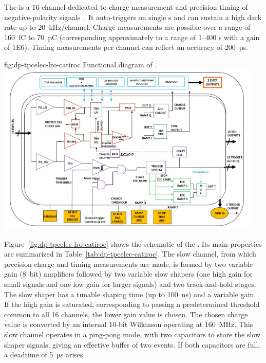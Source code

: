 The  is a \num{16} channel  dedicated to %
charge measurement and precision timing of negative-polarity  signals~\cite{Blin:2017}. It auto-triggers on single \phel{}s and can sustain a high dark rate up to \SI{20}{kHz/channel}. Charge measurements are possible over a range of \SI{160}{fC} to \SI{70}{pC} (corresponding approximately to a range of \numrange{1}{400} \phel{}s with a  gain of \num{1E6}). Timing measurements per channel can reflect an accuracy of \SI{200}{ps}.

\begin{dunefigure}{fig:dp-tpcelec-lro-catiroc}
{Functional diagram of  .}
\includegraphics[width=0.95\textwidth]{graphics/dp-tpcelec-lro-catiroc}
\end{dunefigure}


Figure~\ref{fig:dp-tpcelec-lro-catiroc} shows the schematic of the  . Its main properties are summarized in Table~\ref{tab:dp-tpcelec-catiroc}. The slow channel, from which precision charge and timing measurements are made, is formed by two variable-gain (\SI{8}{bit}) amplifiers followed by two variable slow shapers (one high gain for small signals and one low gain for larger signals) and two track-and-hold stages. The slow shaper has a tunable shaping time (up to \SI{100}{ns}) and a variable gain.  If the high gain is saturated, corresponding to passing a predetermined threshold common to all \num{16} channels, the lower gain value is chosen. The chosen charge value is converted by an internal 10-bit Wilkinson  operating at \SI{160}{MHz}.  This slow channel operates in a ping-pong mode, with two capacitors to store the slow shaper signals, giving an effective buffer of two events. If both capacitors are full, a deadtime of \SI{5}{\micro\second} arises.



